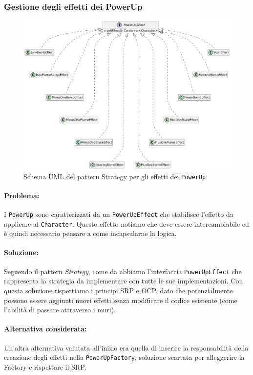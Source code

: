 \documentclass[a4paper,12pt]{report}
\begin{document}
\subsubsection{Gestione degli effetti dei PowerUp}
\begin{figure}[H]
\centering{}
\includegraphics[width=1.0\columnwidth]{img/power-up-effect-strategy-uml.png}
\caption{Schema UML del pattern Strategy per gli effetti dei \texttt{PowerUp}}
\label{img:uml-power-up-effect-strategy}
\end{figure}
\paragraph{Problema:} I \texttt{PowerUp} sono caratterizzati da un \texttt{PowerUpEffect} che stabilisce l'effetto da applicare al \texttt{Character}. Questo effetto notiamo che deve essere intercambiabile ed è quindi necessario pensare a come incapsularne la logica.
\paragraph{Soluzione:} Seguendo il pattern \textit{Strategy}, come da
 abbiamo l'interfaccia \texttt{PowerUpEffect} che rappresenta la strategia da implementare con tutte le sue implementazioni. Con questa soluzione rispettiamo i principi SRP e OCP, dato che potenzialmente possono essere aggiunti nuovi effetti senza modificare il codice esistente (come l'abilità di passare attraverso i muri).
\paragraph{Alternativa considerata:} Un'altra alternativa valutata all'inizio era quella di inserire la responsabilità della creazione degli effetti nella \texttt{PowerUpFactory}, soluzione scartata per alleggerire la Factory e rispettare il SRP.
\end{document}
